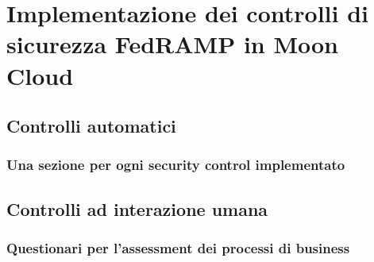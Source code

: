 \documentclass[../main.tex]{subfiles}
\begin{document}
\chapter{Implementazione dei controlli di sicurezza FedRAMP in Moon Cloud}
\section{Controlli automatici}
\subsection{Una sezione per ogni security control implementato}
\section{Controlli ad interazione umana}
\subsection{Questionari per l'assessment dei processi di business}
\end{document}
